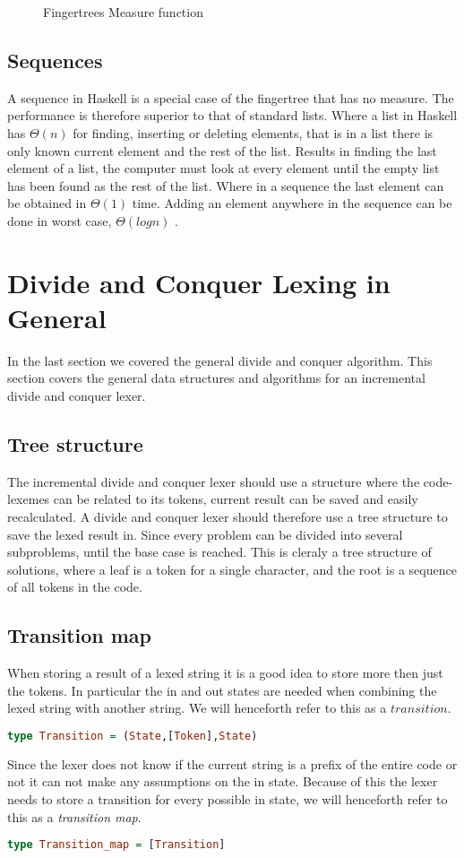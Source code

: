 \begin{figure}[h!]

\caption{Fingertrees Measure function \label{fig:measureFingerTree}}
\end{figure}


\subsection{Sequences}
A sequence in Haskell is a special case of the fingertree that has no measure.
The performance is therefore superior to that of standard lists. Where a list in
Haskell has $\Theta(n)$ for finding, inserting or deleting elements, that is in
a list there is only known current element and the rest of the list. Results in 
finding the last element of a list, the computer must look at every element
until the empty list has been found as the rest of the list. Where in a sequence
the last element can be obtained in $\Theta(1)$ time. Adding an element anywhere
in the sequence can be done in worst case, $\Theta(log n)$ \cite{fingertree}.

\section{Divide and Conquer Lexing in General}
In the last section we covered the general divide and conquer algorithm. This
section covers the general data structures and algorithms for an incremental
divide and conquer lexer.

\subsection{Tree structure}
The incremental divide and conquer lexer should use a structure where the
code-lexemes can be related to its tokens, current result can be saved and
easily recalculated. A divide and conquer lexer should therefore use a tree
structure to save the lexed result in. Since every problem can be divided into
several subproblems, until the base case is reached. This is cleraly a tree
structure of solutions, where a leaf is a token for a single character, and the
root is a sequence of all tokens in the code.  

\subsection{Transition map}
When storing a result of a lexed string it is a good idea to store more then
just the tokens. In particular the in and out states are needed when combining
the lexed string with another string. We will henceforth refer to this as a
$transition$.
\begin{lstlisting}[language=Haskell]
type Transition = (State,[Token],State)
\end{lstlisting}
Since the lexer does not know if the current string is a prefix of the entire
code or not it can not make any assumptions on the in state. Because of this the
lexer needs to store a transition for every possible in state, we will henceforth
refer to this as a \emph{transition map}.
\begin{lstlisting}[language=Haskell]
type Transition_map = [Transition]
\end{lstlisting}
